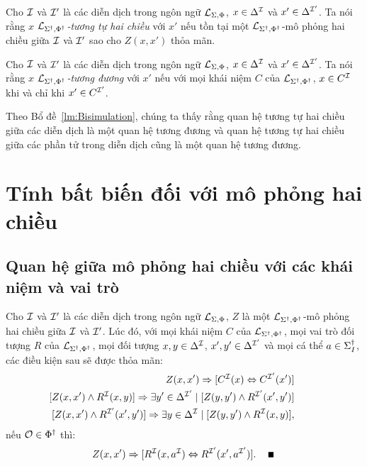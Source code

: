 \begin{Definition}
\label{def:ElementBisimilarity}
	Cho $\mathcal{I}$ và $\mathcal{I}'$ là các diễn dịch trong ngôn ngữ $\mathcal{L}_{\Sigma,\Phi}$, $x \in \Delta^{\mathcal{I}}$ và $x' \in \Delta^{\mathcal{I}'}$. Ta nói rằng $x$ {\em $\mathcal{L}_{\Sigma^\dag,\Phi^\dag}$-tương tự hai chiều} với $x'$ nếu tồn tại một $\mathcal{L}_{\Sigma^\dag,\Phi^\dag}$-mô phỏng hai chiều giữa $\mathcal{I}$ và $\mathcal{I}'$ sao cho $Z(x,x')$ thỏa mãn.\myend	
\end{Definition}

\begin{Definition}
\label{def:LSPEquivalence}
	Cho $\mathcal{I}$ và $\mathcal{I}'$ là các diễn dịch trong ngôn ngữ $\mathcal{L}_{\Sigma,\Phi}$, $x \in \Delta^{\mathcal{I}}$ và $x' \in \Delta^{\mathcal{I}'}$. Ta nói rằng $x$ {\em $\mathcal{L}_{\Sigma^\dag,\Phi^\dag}$-tương đương} với $x'$ nếu với mọi khái niệm $C$ của $\mathcal{L}_{\Sigma^\dag,\Phi^\dag}$, $x \in C^{\mathcal{I}}$ khi và chỉ khi $x' \in C^{\mathcal{I}'}$.\myend
\end{Definition}

Theo Bổ đề~\ref{lm:Bisimulation}, chúng ta thấy rằng quan hệ tương tự hai chiều giữa các diễn dịch là một quan hệ tương đương và quan hệ tương tự hai chiều giữa các phần tử trong diễn dịch cũng là một quan hệ tương đương.

\section{Tính bất biến đối với mô phỏng hai chiều}
\label{sec:Chap2.Invariant}
\subsection{Quan hệ giữa mô phỏng hai chiều với các khái niệm và vai trò}
\label{sec:Chap2.BisConceptRole}
\begin{Lemma}
	\label{lm:Condition}
	Cho $\mathcal{I}$ và $\mathcal{I}'$ là các diễn dịch trong ngôn ngữ $\mathcal{L}_{\Sigma,\Phi}$, $Z$ là một $\mathcal{L}_{\Sigma^\dag,\Phi^\dag}$-mô phỏng hai chiều giữa $\mathcal{I}$ và $\mathcal{I}'$. Lúc đó, với mọi khái niệm $C$ của $\mathcal{L}_{\Sigma^\dag,\Phi^\dag}$, mọi vai trò đối tượng $R$ của $\mathcal{L}_{\Sigma^\dag,\Phi^\dag}$, mọi đối tượng $x, y \in \Delta^{\mathcal{I}}$, $x', y' \in \Delta^{\mathcal{I}'}$ và mọi cá thể $a \in \Sigma^\dag_I$, các điều kiện sau sẽ được thỏa mãn:
	\begin{eqnarray}
	&&\!\!\!\!\!\!\!\!\!\!\!\!\!\!\!\!\!\!\!\!\! Z(x, x') \Rightarrow [C^\mI(x) \Leftrightarrow C^{\mI'}(x')] \label{bs:eqC3}\\
	&&\!\!\!\!\!\!\!\!\!\!\!\!\!\!\!\!\!\!\!\!\! [Z(x, x') \wedge R^\mI(x, y)] \Rightarrow \E y' \in \Delta^{\mI'} \mid [Z(y,y') \wedge R^{\mI'}(x',y')] \label{bs:eqR1}\\
	&&\!\!\!\!\!\!\!\!\!\!\!\!\!\!\!\!\!\!\!\!\! [Z(x, x') \wedge R^{\mI'}(x', y')] \Rightarrow \E y \in \Delta^\mI \mid [Z(y,y') \wedge R^\mI(x,y)], \label{bs:eqR2}
	\end{eqnarray}
	nếu $\mathcal{O} \in \Phi^\dag$ thì:
	\begin{eqnarray}
	&&\!\!\!\!\!\!\! Z(x, x') \Rightarrow [R^\mI(x, a^\mI) \Leftrightarrow R^{\mI'}(x', a^{\mI'})].\quad\label{bs:eqOR}\ \myend
	\end{eqnarray}
\end{Lemma}

